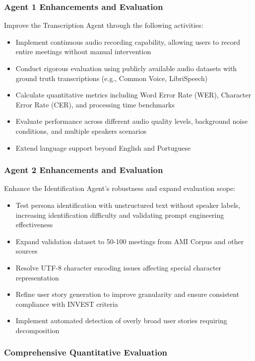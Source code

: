 \documentclass[12pt]{article}
\begin{document}
\subsubsection{Agent 1 Enhancements and Evaluation}

Improve the Transcription Agent through the following activities:

\begin{itemize}
    \item Implement continuous audio recording capability, allowing users to record entire meetings without manual intervention
    \item Conduct rigorous evaluation using publicly available audio datasets with ground truth transcriptions (e.g., Common Voice, LibriSpeech)
    \item Calculate quantitative metrics including Word Error Rate (WER), Character Error Rate (CER), and processing time benchmarks
    \item Evaluate performance across different audio quality levels, background noise conditions, and multiple speakers scenarios
    \item Extend language support beyond English and Portuguese
\end{itemize}

\subsubsection{Agent 2 Enhancements and Evaluation}

Enhance the Identification Agent's robustness and expand evaluation scope:

\begin{itemize}
    \item Test persona identification with unstructured text without speaker labels, increasing identification difficulty and validating prompt engineering effectiveness
    \item Expand validation dataset to 50-100 meetings from AMI Corpus and other sources
    \item Resolve UTF-8 character encoding issues affecting special character representation
    \item Refine user story generation to improve granularity and ensure consistent compliance with INVEST criteria
    \item Implement automated detection of overly broad user stories requiring decomposition
\end{itemize}

\subsubsection{Comprehensive Quantitative Evaluation}
\end{document}

